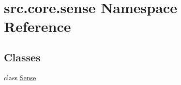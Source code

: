 \hypertarget{namespacesrc_1_1core_1_1sense}{\section{src.\+core.\+sense Namespace Reference}
\label{namespacesrc_1_1core_1_1sense}
}
\subsection*{Classes}
\begin{DoxyCompactItemize}
\item 
class \hyperlink{classsrc_1_1core_1_1sense_1_1_sense}{Sense}
\end{DoxyCompactItemize}
